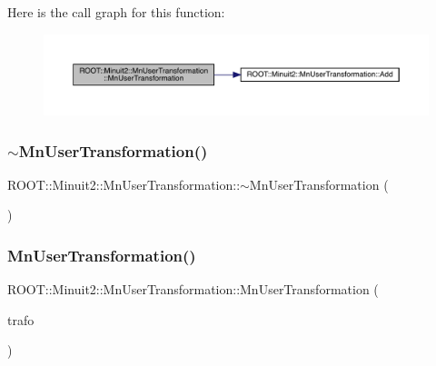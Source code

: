 Here is the call graph for this function\+:\nopagebreak
\begin{figure}[H]
\begin{center}
\leavevmode
\includegraphics[width=350pt]{d9/d98/classROOT_1_1Minuit2_1_1MnUserTransformation_a75c58c9381f8c42adcee7319d2671918_cgraph}
\end{center}
\end{figure}
\mbox{\label{classROOT_1_1Minuit2_1_1MnUserTransformation_a1510c72a07c9d089f16a4536ceacde56}} 
\subsubsection{\texorpdfstring{$\sim$MnUserTransformation()}{~MnUserTransformation()}\hspace{0.1cm}{\footnotesize\ttfamily [1/3]}}
{\footnotesize\ttfamily R\+O\+O\+T\+::\+Minuit2\+::\+Mn\+User\+Transformation\+::$\sim$\+Mn\+User\+Transformation (\begin{DoxyParamCaption}{ }\end{DoxyParamCaption})\hspace{0.3cm}{\ttfamily [inline]}}

\mbox{\label{classROOT_1_1Minuit2_1_1MnUserTransformation_ae2bba4ce251f0eab8719900620addef9}} 
\subsubsection{\texorpdfstring{MnUserTransformation()}{MnUserTransformation()}\hspace{0.1cm}{\footnotesize\ttfamily [3/9]}}
{\footnotesize\ttfamily R\+O\+O\+T\+::\+Minuit2\+::\+Mn\+User\+Transformation\+::\+Mn\+User\+Transformation (\begin{DoxyParamCaption}\item[{const \mbox{\hyperlink{classROOT_1_1Minuit2_1_1MnUserTransformation}{Mn\+User\+Transformation}} \&}]{trafo }\end{DoxyParamCaption})\hspace{0.3cm}{\ttfamily [inline]}}

